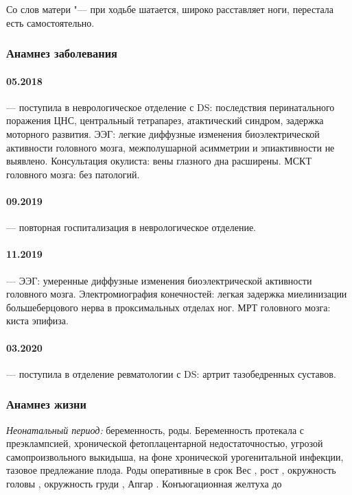 \documentclass[a4paper,14pt]{extarticle}
\newcommand{\gramm}{г}
\newcommand{\cm}{см}
\newcommand{\months}{мес.}
\newcommand{\weeks}{нед.}
\begin{document}
Со слов матери "--- при ходьбе шатается, широко расставляет ноги, перестала есть самостоятельно.

\subsubsection*{Анамнез заболевания}

\paragraph{05.2018} --- поступила в неврологическое отделение с DS: последствия перинатального поражения ЦНС, центральный тетрапарез, атактический синдром, задержка моторного развития.
ЭЭГ: легкие диффузные изменения биоэлектрической активности головного мозга, межполушарной асимметрии и эпиактивности не выявлено.
Консультация окулиста: вены глазного дна расширены.
МСКТ головного мозга: без патологий.
\paragraph{09.2019} --- повторная госпитализация в неврологическое отделение.
\paragraph{11.2019} --- ЭЭГ: умеренные диффузные изменения биоэлектрической активности головного мозга.
Электромиография конечностей: легкая задержка миелинизации большеберцового нерва в проксимальных отделах ног.
МРТ головного мозга: киста эпифиза.
\paragraph{03.2020} --- поступила в отделение ревматологии с DS: артрит тазобедренных суставов.

\subsubsection*{Анамнез жизни}

\emph{Неонатальный период:}
 беременность,  роды.
Беременность протекала с преэклампсией, хронической фетоплацентарной недостаточностью, угрозой самопроизвольного выкидыша, на фоне хронической урогенитальной инфекции, тазовое предлежание плода.
Роды оперативные в срок \numprint[\weeks]{39}
Вес \numprint[\gramm]{3040}, рост \numprint[\cm]{53}, окружность головы \numprint[\cm]{34}, окружность груди \numprint[\cm]{33}, Апгар .
Конъюгационная желтуха  до \numprint[\months]{1} 
\end{document}
